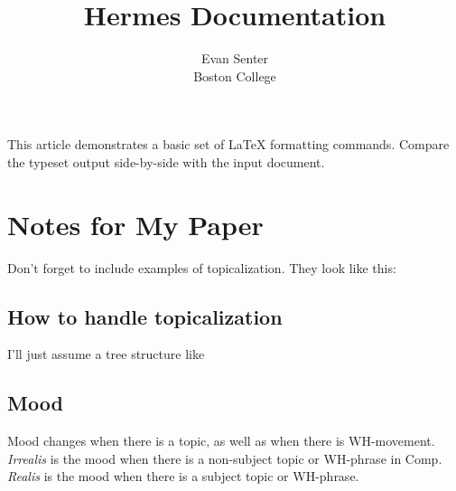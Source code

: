\documentclass[11pt]{article}
\begin{document}
\title{Hermes Documentation}
\author{Evan Senter\\
Boston College}
\renewcommand{\today}{June 2014}
\maketitle
This article demonstrates a basic set of LaTeX formatting commands.
Compare the typeset output side-by-side with the input document.

\section{Notes for My Paper}

Don't forget to include examples of topicalization.
They look like this:

\subsection{How to handle topicalization}

I'll just assume a tree structure like 

\subsection{Mood}

Mood changes when there is a topic, as well as when
there is WH-movement.  \emph{Irrealis} is the mood when
there is a non-subject topic or WH-phrase in Comp.
\emph{Realis} is the mood when there is a subject topic
or WH-phrase.
\end{document}
